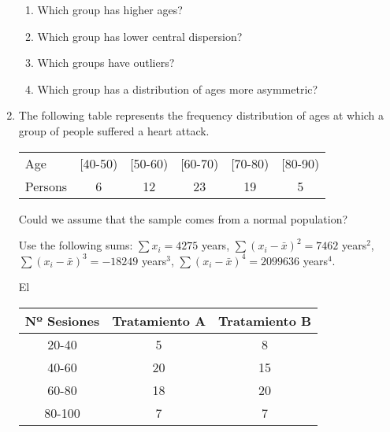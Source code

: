 \begin{enumerate}[leftmargin=*]
\begin{enumerate}
\item Which group has higher ages?
\item Which group has lower central dispersion?
\item Which groups have outliers?
\item Which group has a distribution of ages more asymmetric?
\end{enumerate}


\item The following table represents the frequency distribution of ages at which a group of people suffered a heart
attack. 
\begin{center}
\begin{tabular}{lccccc}
\toprule
Age & [40-50) & [50-60) & [60-70) & [70-80) & [80-90)  \\ 
Persons & 6 & 12 & 23 & 19 & 5  \\ 
\bottomrule
\end{tabular}
\end{center}

Could we assume that the sample comes from a normal population?

Use the following sums: $\sum x_i= 4275$ years, $\sum (x_i-\bar x)^2=7462$ years$^2$, $\sum (x_i-\bar x)^3=-18249$
years$^3$, $\sum (x_i-\bar x)^4=2099636$ years$^4$.

El 
\begin{tabular}{|l|l|l|}
\hline
\multicolumn{1}{|c|}{Nº Sesiones} & \multicolumn{1}{c|}{Tratamiento A} & \multicolumn{1}{c|}{Tratamiento B} \\
\hline
\multicolumn{1}{|c|}{20-40} & \multicolumn{1}{c|}{5} & \multicolumn{1}{c|}{8} \\
\hline
\multicolumn{1}{|c|}{40-60} & \multicolumn{1}{c|}{20} & \multicolumn{1}{c|}{15} \\
\hline
\multicolumn{1}{|c|}{60-80} & \multicolumn{1}{c|}{18} & \multicolumn{1}{c|}{20} \\
\hline
\multicolumn{1}{|c|}{80-100} & \multicolumn{1}{c|}{7} & \multicolumn{1}{c|}{7} \\
\hline
\end{tabular}





\end{enumerate}